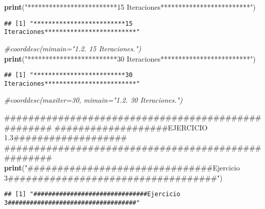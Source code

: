 \documentclass[]{article}
\newenvironment{Shaded}{\begin{snugshade}}{\end{snugshade}}
\newcommand{\KeywordTok}[1]{\textcolor[rgb]{0.13,0.29,0.53}{\textbf{{#1}}}}
\newcommand{\StringTok}[1]{\textcolor[rgb]{0.31,0.60,0.02}{{#1}}}
\newcommand{\CommentTok}[1]{\textcolor[rgb]{0.56,0.35,0.01}{\textit{{#1}}}}
\newcommand{\NormalTok}[1]{{#1}}
\begin{document}
\begin{Shaded}
\begin{Highlighting}[]
\KeywordTok{print}\NormalTok{(}\StringTok{"*************************15 Iteraciones*************************"}\NormalTok{)}
\end{Highlighting}
\end{Shaded}

\begin{verbatim}
## [1] "*************************15 Iteraciones*************************"
\end{verbatim}

\begin{Shaded}
\begin{Highlighting}[]
\CommentTok{#coorddesc(mimain="1.2. 15 Iteraciones.")}
\KeywordTok{print}\NormalTok{(}\StringTok{"*************************30 Iteraciones*************************"}\NormalTok{)}
\end{Highlighting}
\end{Shaded}

\begin{verbatim}
## [1] "*************************30 Iteraciones*************************"
\end{verbatim}

\begin{Shaded}
\begin{Highlighting}[]
\CommentTok{#coorddesc(maxiter=30, mimain="1.2. 30 Iteraciones.")}

\NormalTok{###################################################}
\NormalTok{###################EJERCICIO 1.3###################}
\NormalTok{###################################################}
\KeywordTok{print}\NormalTok{(}\StringTok{"###############################Ejercicio 3###################################"}\NormalTok{)}
\end{Highlighting}
\end{Shaded}

\begin{verbatim}
## [1] "###############################Ejercicio 3###################################"
\end{verbatim}
\end{document}
